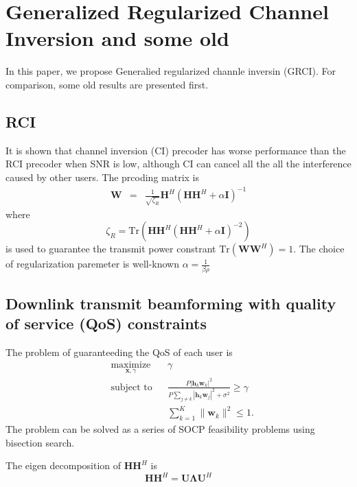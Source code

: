 \documentclass[12pt,journal,draftclsnofoot,onecolumn]{IEEEtran}
\begin{document}
\section{Generalized Regularized Channel Inversion and some old}
In this paper, we propose Generalied regularized channle inversin (GRCI). For comparison, some old results are presented first.
\subsection{RCI}
It is shown that channel inversion (CI) precoder has worse performance than the RCI precoder when SNR is low, although CI can cancel all the all the interference caused by other users. The prcoding matrix is
\begin{eqnarray}
	\mathbf{W} &=& \frac{1}{\sqrt{\zeta_R}}\mathbf{H}^H\left(\mathbf{H}\mathbf{H}^H + \alpha\mathbf{I}\right)^{-1}
\end{eqnarray}
where
\begin{equation} \label{eq:zeta_R}
	\zeta_R = \mathrm{Tr}\left(\mathbf{H}\mathbf{H}^H\left(\mathbf{H}\mathbf{H}^H + \alpha\mathbf{I}\right)^{-2}\right)
\end{equation}
is used to guarantee the transmit power constrant $\mathrm{Tr}\left(\mathbf{W}\mathbf{W}^H\right) = 1$. The choice of regularization paremeter is well-known $\alpha = \frac{1}{\beta\rho}$

\subsection{Downlink transmit beamforming with quality of service (QoS) constraints}
The problem of guaranteeding the QoS of each user is 
\begin{equation}
\begin{aligned} \label{eq:problem_qos}
& \underset{\mathbf{x},\gamma}{\text{maximize}}
& & \gamma \\
& \text{subject to}
& &  \frac{P|\mathbf{h}_{k}\mathbf{w}_k|^2}{P\sum_{j \neq k}|\mathbf{h}_{k}\mathbf{w}_j|^2 + \sigma^2} \geq \gamma\\
&&& \sum_{k = 1}^{K}\|\mathbf{w}_k\|^2 \leq 1.
\end{aligned}
\end{equation}
The problem can be solved as a series of SOCP feasibility problems using bisection search.



The eigen decomposition of $\mathbf{H}\mathbf{H}^H$ is
\begin{equation}
	\mathbf{H}\mathbf{H}^H = \mathbf{U}\mathbf{\Lambda}\mathbf{U}^H
\end{equation}
\end{document}
